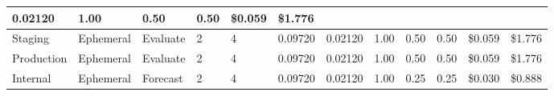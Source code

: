 \begin{landscape}
\begin{table}[!htbp]
\begin{tabular}{llllllllllll}
      \multicolumn{1}{l|}{\cellcolor[HTML]{65BE7B}0.02120} &
      \multicolumn{1}{l|}{\cellcolor[HTML]{FFEB84}1.00} &
      \multicolumn{1}{l|}{\cellcolor[HTML]{B0D47F}0.50} &
      \multicolumn{1}{l|}{\cellcolor[HTML]{64BE7B}0.50} &
      \multicolumn{1}{l|}{\cellcolor[HTML]{71C27B}\$0.059} &
      \multicolumn{1}{l|}{\cellcolor[HTML]{71C27B}\$1.776} \\ \hline
    \multicolumn{1}{|l|}{\cellcolor[HTML]{FFFF00}Staging} &
      \multicolumn{1}{l|}{\cellcolor[HTML]{99CCFF}Ephemeral} &
      \multicolumn{1}{l|}{\cellcolor[HTML]{E8F4BA}Evaluate} &
      \multicolumn{1}{l|}{\cellcolor[HTML]{BDD881}2} &
      \multicolumn{1}{l|}{\cellcolor[HTML]{BDD881}4} &
      \multicolumn{1}{l|}{\cellcolor[HTML]{FCB47A}0.09720} &
      \multicolumn{1}{l|}{\cellcolor[HTML]{65BE7B}0.02120} &
      \multicolumn{1}{l|}{\cellcolor[HTML]{FFEB84}1.00} &
      \multicolumn{1}{l|}{\cellcolor[HTML]{B0D47F}0.50} &
      \multicolumn{1}{l|}{\cellcolor[HTML]{64BE7B}0.50} &
      \multicolumn{1}{l|}{\cellcolor[HTML]{71C27B}\$0.059} &
      \multicolumn{1}{l|}{\cellcolor[HTML]{71C27B}\$1.776} \\ \hline
    \multicolumn{1}{|l|}{\cellcolor[HTML]{EFC321}Production} &
      \multicolumn{1}{l|}{\cellcolor[HTML]{99CCFF}Ephemeral} &
      \multicolumn{1}{l|}{\cellcolor[HTML]{E8F4BA}Evaluate} &
      \multicolumn{1}{l|}{\cellcolor[HTML]{BDD881}2} &
      \multicolumn{1}{l|}{\cellcolor[HTML]{BDD881}4} &
      \multicolumn{1}{l|}{\cellcolor[HTML]{FCB47A}0.09720} &
      \multicolumn{1}{l|}{\cellcolor[HTML]{65BE7B}0.02120} &
      \multicolumn{1}{l|}{\cellcolor[HTML]{FFEB84}1.00} &
      \multicolumn{1}{l|}{\cellcolor[HTML]{B0D47F}0.50} &
      \multicolumn{1}{l|}{\cellcolor[HTML]{64BE7B}0.50} &
      \multicolumn{1}{l|}{\cellcolor[HTML]{71C27B}\$0.059} &
      \multicolumn{1}{l|}{\cellcolor[HTML]{71C27B}\$1.776} \\ \hline
    \multicolumn{1}{|l|}{\cellcolor[HTML]{92D050}Internal} &
      \multicolumn{1}{l|}{\cellcolor[HTML]{99CCFF}Ephemeral} &
      \multicolumn{1}{l|}{\cellcolor[HTML]{D1E977}Forecast} &
      \multicolumn{1}{l|}{\cellcolor[HTML]{BDD881}2} &
      \multicolumn{1}{l|}{\cellcolor[HTML]{BDD881}4} &
      \multicolumn{1}{l|}{\cellcolor[HTML]{FCB47A}0.09720} &
      \multicolumn{1}{l|}{\cellcolor[HTML]{65BE7B}0.02120} &
      \multicolumn{1}{l|}{\cellcolor[HTML]{FFEB84}1.00} &
      \multicolumn{1}{l|}{\cellcolor[HTML]{89C97D}0.25} &
      \multicolumn{1}{l|}{\cellcolor[HTML]{63BE7B}0.25} &
      \multicolumn{1}{l|}{\cellcolor[HTML]{63BE7B}\$0.030} &
      \multicolumn{1}{l|}{\cellcolor[HTML]{63BE7B}\$0.888} \\ \hline

\end{tabular}
\end{table}
\end{landscape}
